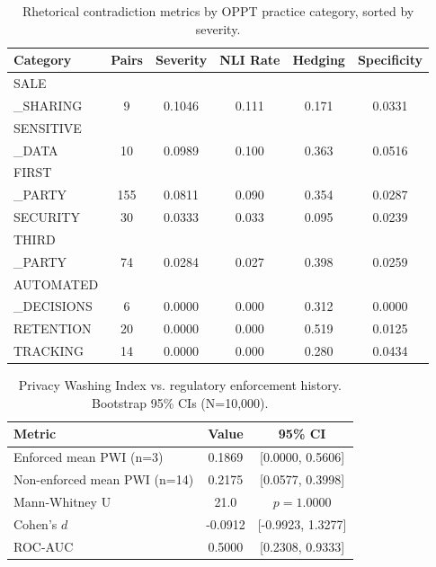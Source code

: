 \begin{table}[t]
\centering
\caption{Rhetorical contradiction metrics by OPPT practice category, sorted by severity.}
\label{tab:categories}
\begin{tabular}{lccccc}
\toprule
Category & Pairs & Severity & NLI Rate & Hedging & Specificity \\
\midrule
SALE\\_SHARING & 9 & 0.1046 & 0.111 & 0.171 & 0.0331 \\
SENSITIVE\\_DATA & 10 & 0.0989 & 0.100 & 0.363 & 0.0516 \\
FIRST\\_PARTY & 155 & 0.0811 & 0.090 & 0.354 & 0.0287 \\
SECURITY & 30 & 0.0333 & 0.033 & 0.095 & 0.0239 \\
THIRD\\_PARTY & 74 & 0.0284 & 0.027 & 0.398 & 0.0259 \\
AUTOMATED\\_DECISIONS & 6 & 0.0000 & 0.000 & 0.312 & 0.0000 \\
RETENTION & 20 & 0.0000 & 0.000 & 0.519 & 0.0125 \\
TRACKING & 14 & 0.0000 & 0.000 & 0.280 & 0.0434 \\
\bottomrule
\end{tabular}
\end{table}

\begin{table}[t]
\centering
\caption{Privacy Washing Index vs. regulatory enforcement history. Bootstrap 95\% CIs (N=10,000).}
\label{tab:enforcement}
\begin{tabular}{lcc}
\toprule
Metric & Value & 95\% CI \\
\midrule
Enforced mean PWI (n=3) & 0.1869 & [0.0000, 0.5606] \\
Non-enforced mean PWI (n=14) & 0.2175 & [0.0577, 0.3998] \\
Mann-Whitney U & 21.0 & $p=1.0000$ \\
Cohen's $d$ & -0.0912 & [-0.9923, 1.3277] \\
ROC-AUC & 0.5000 & [0.2308, 0.9333] \\
\bottomrule
\end{tabular}
\end{table}